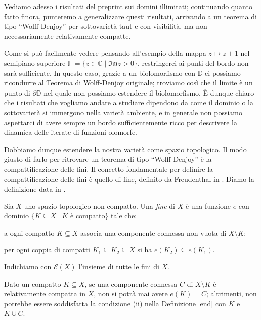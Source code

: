 Vediamo adesso i risultati del preprint \cite{BZ2} sui domini illimitati; continuando quanto fatto finora, punteremo a generalizzare questi risultati, arrivando a un teorema di tipo ``Wolff-Denjoy'' per sottovarietà taut e con visibilità, ma non necessariamente relativamente compatte.

Come si può facilmente vedere pensando all'esempio della mappa $z\longmapsto z+1$ nel semipiano superiore $\mathbb{H}=\{z\in\mathbb{C}\mid\mathfrak{Im}z>0\}$, restringerci ai punti del bordo non sarà sufficiente. In questo caso, grazie a un biolomorfismo con $\mathbb{D}$ ci possiamo ricondurre al Teorema di Wolff-Denjoy originale; troviamo così che il limite è un punto di $\partial\mathbb{D}$ nel quale non possiamo estendere il biolomorfismo. È dunque chiaro che i risultati che vogliamo andare a studiare dipendono da come il dominio o la sottovarietà si immergono nella varietà ambiente, e in generale non possiamo aspettarci di avere sempre un bordo sufficientemente ricco per descrivere la dinamica delle iterate di funzioni olomorfe.

Dobbiamo dunque estendere la nostra varietà come spazio topologico. Il modo giusto di farlo per ritrovare un teorema di tipo ``Wolff-Denjoy'' è la compattificazione delle fini. Il concetto fondamentale per definire la compattificazione delle fini è quello di fine, definito da Freudenthal in \cite{F}. Diamo la definizione data in \cite[Chapter 1, Problem 19]{Sp}.

\begin{defn} \label{end}
    Sia $X$ uno spazio topologico non compatto. Una \textit{fine} di $X$ è una funzione $e$ con dominio $\{K\subseteq X\mid K\text{ è compatto}\}$ tale che:
    \begin{nlist}
        \item a ogni compatto $K\subseteq X$ associa una componente connessa non vuota di $X\setminus K$;
        \item per ogni coppia di compatti $K_1\subseteq K_2\subseteq X$ si ha $e(K_2)\subseteq e(K_1)$.
    \end{nlist}
    Indichiamo con $\mathcal{E}(X)$ l'insieme di tutte le fini di $X$.
\end{defn}

\begin{oss} \label{endnonrelcpt}
    Dato un compatto $K\subseteq X$, se una componente connessa $C$ di $X\setminus K$ è relativamente compatta in $X$, non si potrà mai avere $e(K)=C$; altrimenti, non potrebbe essere soddisfatta la condizione (ii) nella Definizione \ref{end} con $K$ e $K\cup\overline{C}$.
\end{oss}

